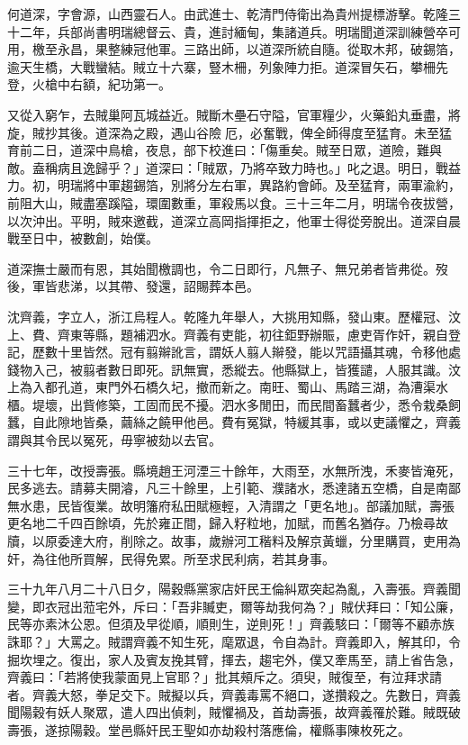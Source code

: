 \begin{pinyinscope}
何道深，字會源，山西靈石人。由武進士、乾清門侍衛出為貴州提標游擊。乾隆三十二年，兵部尚書明瑞總督云、貴，進討緬甸，集諸道兵。明瑞聞道深訓練營卒可用，檄至永昌，果整練冠他軍。三路出師，以道深所統自隨。從取木邦，破錫箔，逾天生橋，大戰蠻結。賊立十六寨，豎木柵，列象陣力拒。道深冒矢石，攀柵先登，火槍中右額，紀功第一。

又從入窮乍，去賊巢阿瓦城益近。賊斷木壘石守隘，官軍糧少，火藥鉛丸垂盡，將旋，賊抄其後。道深為之殿，遇山谷險厄，必奮戰，俾全師得度至猛育。未至猛育前二日，道深中鳥槍，夜息，部下校進曰：「傷重矣。賊至日眾，道險，難與敵。盍稱病且逸歸乎？」道深曰：「賊眾，乃將卒致力時也。」叱之退。明日，戰益力。初，明瑞將中軍趨錫箔，別將分左右軍，異路約會師。及至猛育，兩軍渝約，前阻大山，賊盡塞蹊隘，環圍數重，軍殺馬以食。三十三年二月，明瑞令夜拔營，以次沖出。平明，賊來邀截，道深立高岡指揮拒之，他軍士得從旁脫出。道深自晨戰至日中，被數創，始僕。

道深撫士嚴而有恩，其始聞檄調也，令二日即行，凡無子、無兄弟者皆弗從。歿後，軍皆悲涕，以其帶、發還，詔賜葬本邑。

沈齊義，字立人，浙江烏程人。乾隆九年舉人，大挑用知縣，發山東。歷權冠、汶上、費、齊東等縣，題補泗水。齊義有吏能，初往鉅野辦賑，慮吏胥作奸，親自登記，歷數十里皆然。冠有翦辮訛言，謂妖人翦人辮發，能以咒語攝其魂，令移他處錢物入己，被翦者數日即死。訊無實，悉縱去。他縣獄上，皆獲譴，人服其識。汶上為入都孔道，東門外石橋久圮，撤而新之。南旺、蜀山、馬踏三湖，為漕渠水櫃。堤壞，出貲修築，工固而民不擾。泗水多閒田，而民間畜蠶者少，悉令栽桑飼蠶，自此隙地皆桑，繭絲之饒甲他邑。費有冤獄，特緩其事，或以吏議懼之，齊義謂與其令民以冤死，毋寧被劾以去官。

三十七年，改授壽張。縣境趙王河湮三十餘年，大雨至，水無所洩，禾麥皆淹死，民多逃去。請募夫開濬，凡三十餘里，上引範、濮諸水，悉達諸五空橋，自是南鄙無水患，民皆復業。故明籓府私田賦極輕，入清謂之「更名地」。部議加賦，壽張更名地二千四百餘頃，先於雍正間，歸入籽粒地，加賦，而舊名猶存。乃檢尋故牘，以原委達大府，削除之。故事，歲辦河工稭料及解京黃蠟，分里購買，吏用為奸，為往他所買解，民得免累。所至求民利病，若其身事。

三十九年八月二十八日夕，陽穀縣黨家店奸民王倫糾眾突起為亂，入壽張。齊義聞變，即衣冠出蒞宅外，斥曰：「吾非贓吏，爾等劫我何為？」賊伏拜曰：「知公廉，民等亦素沐公恩。但須及早從順，順則生，逆則死！」齊義駭曰：「爾等不顧赤族誅耶？」大罵之。賊謂齊義不知生死，麾眾退，令自為計。齊義即入，解其印，令掘坎埋之。復出，家人及賓友挽其臂，揮去，趨宅外，僕又牽馬至，請上省告急，齊義曰：「若將使我蒙面見上官耶？」批其頰斥之。須臾，賊復至，有泣拜求請者。齊義大怒，拳足交下。賊擬以兵，齊義毒罵不絕口，遂攢殺之。先數日，齊義聞陽穀有妖人聚眾，遣人四出偵刺，賊懼禍及，首劫壽張，故齊義罹於難。賊既破壽張，遂掠陽穀。堂邑縣奸民王聖如亦劫殺村落應倫，權縣事陳枚死之。


\end{pinyinscope}
